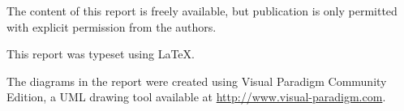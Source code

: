 \thispagestyle{empty}
{\small
\strut\vfill %

\noindent The content of this report is freely available, but publication is only permitted with explicit permission from the authors.
\vspace{0.2cm}

\noindent This report was typeset using \LaTeX.
\vspace{0.2cm}

\noindent The diagrams in the report were created using Visual Paradigm Community Edition, a UML drawing tool available at \url{http://www.visual-paradigm.com}.
}
\clearpage

